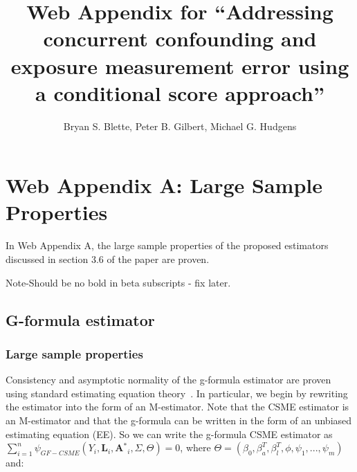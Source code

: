 \documentclass[12pt]{article}
\title{Web Appendix for ``Addressing concurrent confounding and exposure measurement error using a conditional score approach''}
\author{Bryan S. Blette, Peter B. Gilbert, Michael G. Hudgens}
\date{}
\begin{document}


\maketitle

\section{Web Appendix A: Large Sample Properties}

In Web Appendix A, the large sample properties of the proposed estimators discussed in section 3.6 of the paper are proven.

Note-Should be no bold in beta subscripts - fix later.

\subsection{G-formula estimator}

\subsubsection{Large sample properties}

Consistency and asymptotic normality of the g-formula estimator are proven using standard estimating equation theory~\citep{stefanski2002}. In particular, we begin by rewriting the estimator into the form of an M-estimator. Note that the CSME estimator is an M-estimator and that the g-formula can be written in the form of an unbiased estimating equation (EE). So we can write the g-formula CSME estimator as $\sum_{i=1}^{n} \psi_{GF-CSME}(Y_{i}, \textbf{L}_{i}, \textbf{A$^{*}$}_{i}, \Sigma, \Theta) = 0$, where $\Theta = (\beta_{0}, \beta^{T}_{a}, \beta^{T}_{l}, \phi, \psi_{1}, ..., \psi_{m})$ and:
\end{document}
